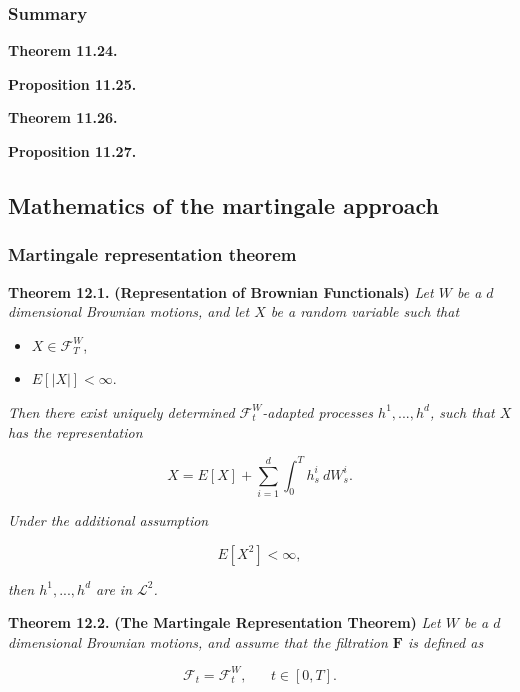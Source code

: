 \documentclass[
]{article}
\providecommand{\tightlist}{%
  \setlength{\itemsep}{0pt}\setlength{\parskip}{0pt}}
\begin{document}
\hypertarget{summary}{%
\subsubsection{Summary}\label{summary}}

\textbf{Theorem 11.24.}

\textbf{Proposition 11.25.}

\textbf{Theorem 11.26.}

\textbf{Proposition 11.27.}

\hypertarget{mathematics-of-the-martingale-approach}{%
\subsection{Mathematics of the martingale
approach}\label{mathematics-of-the-martingale-approach}}

\hypertarget{martingale-representation-theorem}{%
\subsubsection{Martingale representation
theorem}\label{martingale-representation-theorem}}

\textbf{Theorem 12.1.} \textbf{(Representation of Brownian Functionals)}
\emph{Let \(W\) be a \(d\) dimensional Brownian motions, and let \(X\)
be a random variable such that}

\begin{itemize}
\tightlist
\item
  \(X\in\mathcal{F}^W_T\),
\item
  \(E[\vert X\vert]<\infty\).
\end{itemize}

\emph{Then there exist uniquely determined \(\mathcal{F}^W_t\)-adapted
processes \(h^1,...,h^d\), such that \(X\) has the representation}

\[
X=E[X]+\sum_{i=1}^d\int_0^Th^i_s\ dW_s^i.\tag{12.2}
\]

\emph{Under the additional assumption}

\[
E[X^2]<\infty,
\]

\emph{then \(h^1,...,h^d\) are in \(\mathcal{L}^2\).}

\textbf{Theorem 12.2.} \textbf{(The Martingale Representation Theorem)}
\emph{Let \(W\) be a \(d\) dimensional Brownian motions, and assume that
the filtration \(\mathbf{F}\) is defined as}

\[
\mathcal{F}_t=\mathcal{F}^W_t,\hspace{20pt}t\in[0,T].
\]
\end{document}
